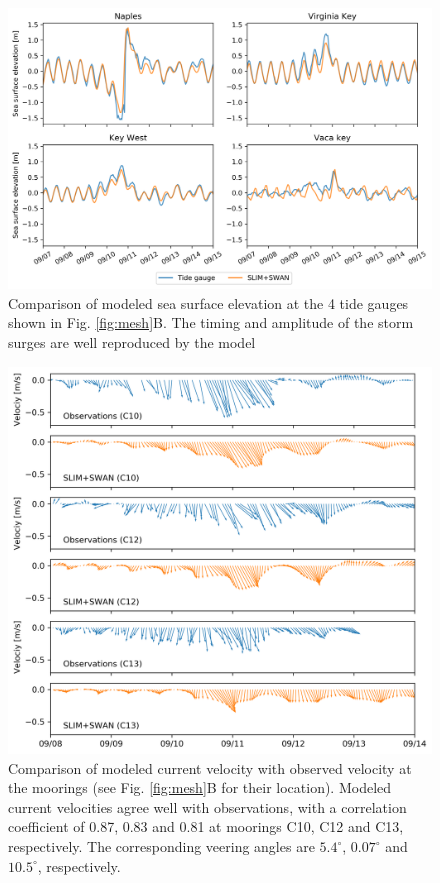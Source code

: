 \begin{figure}
    \centering
    \includegraphics[width=\textwidth]{chapters/irma/figures/validation_eta.png}
    \caption{Comparison of modeled sea surface elevation at the 4 tide gauges shown in Fig. \ref{fig:mesh}B. The timing and amplitude of the storm surges are well reproduced by the model}
    \label{fig:sse}
\end{figure}
\begin{figure}
    \includegraphics[width=\textwidth]{chapters/irma/figures/figure_currents_all.png}
    \caption{Comparison of modeled current velocity with observed velocity at the moorings (see Fig. \ref{fig:mesh}B for their location). Modeled current velocities agree well with observations, with a correlation coefficient of 0.87, 0.83 and 0.81 at moorings C10, C12 and C13, respectively. The corresponding veering angles are $5.4^\circ$, $0.07^\circ$ and $10.5^\circ$, respectively.}
    \label{fig:uv}
\end{figure}

